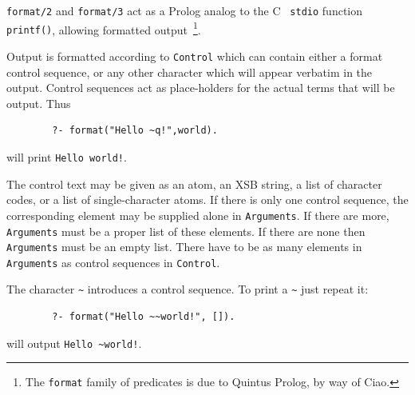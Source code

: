 \begin{description}

{\tt format/2} and {\tt format/3} act as a Prolog analog to the C {\tt
stdio} function {\tt printf()}, allowing formatted
output~\footnote{The {\tt format} family of predicates is due to
Quintus Prolog, by way of Ciao.}.

Output is formatted according to {\tt Control} which can contain either
a format control sequence, or any other character which will appear
verbatim in the output. Control sequences act as place-holders for the
actual terms that will be output.  Thus
\begin{verbatim}
        ?- format("Hello ~q!",world).
\end{verbatim}

\noindent
will print {\tt Hello world!}.

The control text may be given as an atom, an XSB string, a list of
character codes, or a list of single-character atoms.  If there is
only one control sequence, the corresponding element may be supplied
alone in {\tt Arguments}.  If there are more, {\tt Arguments} must be a
proper list of these elements. If there are none then {\tt Arguments}
must be an empty list. There have to be as many elements in {\tt
Arguments} as control sequences in {\tt Control}.

The character \verb|~| introduces a control sequence. To print 
        a \verb|~| just repeat it:  
        \begin{verbatim}
        ?- format("Hello ~~world!", []).
        \end{verbatim}
      \noindent
        will output  \verb|Hello ~world!|.



\end{description}
